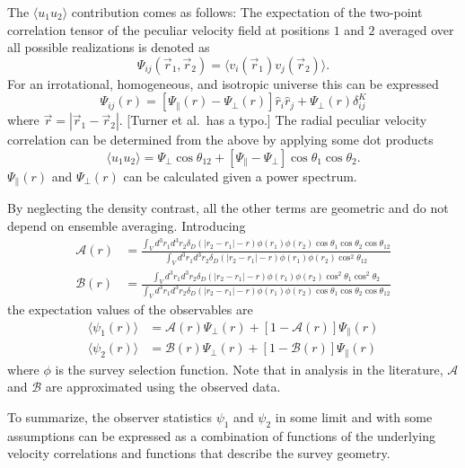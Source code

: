 \documentclass[11pt, oneside]{article}   	%
\begin{document}
The $\langle u_1 u_2 \rangle$ contribution comes as follows:
The expectation of the
two-point correlation tensor of the peculiar velocity field at positions $1$ and $2$ averaged over all possible realizations
is denoted as
\begin{equation}
\Psi_{ij}(\vec{r}_1, \vec{r}_2)=\langle v_i(\vec{r}_1) v_j(\vec{r}_2)\rangle.
\end{equation}
For an irrotational, homogeneous, and isotropic universe this can be expressed
\begin{equation}
\Psi_{ij}(r)=[\Psi_\parallel(r)-\Psi_\perp(r)] \hat{r}_{i} \hat{r}_{j} + \Psi_\perp(r) \delta^K_{ij}
\end{equation}
where $\vec{r}=|\vec{r}_1- \vec{r}_2|$.
[Turner et al.\ has a typo.]
The  radial peculiar velocity correlation can be determined from the above by applying some dot products
\begin{equation}
\langle u_1 u_2 \rangle = \Psi_\perp \cos{\theta_{12}} + [\Psi_\parallel - \Psi_\perp] \cos{\theta_1} \cos{\theta_2}.
\end{equation}
$\Psi_\parallel(r)$ and $\Psi_\perp(r)$ can be calculated given a power spectrum.

By neglecting the density contrast, all the other terms are geometric and do not depend on ensemble averaging.
Introducing
\begin{align}
\mathcal{A}(r) &=\frac{ \int_V d^3r_1 d^3r_2 \delta_D(|r_2-r_1|-r) \phi(r_1)\phi(r_2)  \cos{\theta_1}\cos{\theta_2}\cos{\theta_{12}}}
{ \int_V d^3r_1 d^3r_2 \delta_D(|r_2-r_1|-r) \phi(r_1)\phi(r_2)  \cos^2{\theta_{12}}}\\
\mathcal{B}(r) &= \frac{ \int_V d^3r_1 d^3r_2 \delta_D(|r_2-r_1|-r) \phi(r_1)\phi(r_2)  \cos^2{\theta_1}\cos^2{\theta_2}}
{ \int_V d^3r_1 d^3r_2 \delta_D(|r_2-r_1|-r) \phi(r_1)\phi(r_2)  \cos{\theta_1}\cos{\theta_2}\cos{\theta_{12}}}
\end{align}
the expectation values of the observables are
\begin{align}
\langle \psi_1(r) \rangle &= \mathcal{A}(r) \Psi_{\perp}(r) + [1-\mathcal{A}(r)] \Psi_{\parallel} (r)\\
\langle \psi_2(r) \rangle &= \mathcal{B}(r) \Psi_{\perp}(r) + [1-\mathcal{B}(r)] \Psi_{\parallel} (r)
\end{align}
where $\phi$ is the survey selection function.
Note that in analysis in the literature, $\mathcal{A}$ and $\mathcal{B}$ are approximated using the observed data.

To summarize, the observer statistics $\psi_1$ and $\psi_2$ in some limit and with some assumptions can be
expressed as a combination of functions of the underlying velocity correlations and functions that describe the survey
geometry.
\end{document}

